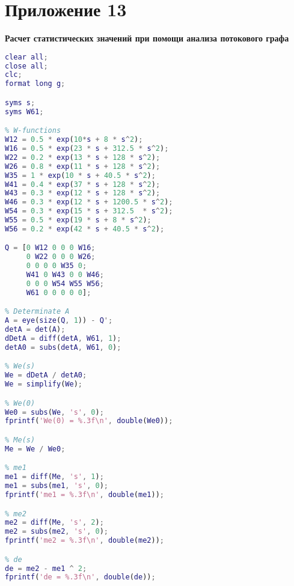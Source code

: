 \section*{Приложение 13} \label{p4:13}
\textbf{Расчет статистических значений при помощи анализа потокового графа}
\begin{lstlisting}[language={matlab}, caption={Расчет статистических значений при помощи анализа потокового графа}, label={lst:0}, basicstyle={\small\ttfamily}, breaklines={true}]
clear all;
close all; 
clc;
format long g;

syms s;
syms W61;

% W-functions
W12 = 0.5 * exp(10*s + 8 * s^2);
W16 = 0.5 * exp(23 * s + 312.5 * s^2);
W22 = 0.2 * exp(13 * s + 128 * s^2);
W26 = 0.8 * exp(11 * s + 128 * s^2);
W35 = 1 * exp(10 * s + 40.5 * s^2);
W41 = 0.4 * exp(37 * s + 128 * s^2);
W43 = 0.3 * exp(12 * s + 128 * s^2);
W46 = 0.3 * exp(12 * s + 1200.5 * s^2);
W54 = 0.3 * exp(15 * s + 312.5  * s^2);
W55 = 0.5 * exp(19 * s + 8 * s^2);
W56 = 0.2 * exp(42 * s + 40.5 * s^2);

Q = [0 W12 0 0 0 W16;
	 0 W22 0 0 0 W26;
  	 0 0 0 0 W35 0;
 	 W41 0 W43 0 0 W46;
 	 0 0 0 W54 W55 W56;
	 W61 0 0 0 0 0];

% Determinate A
A = eye(size(Q, 1)) - Q';
detA = det(A);
dDetA = diff(detA, W61, 1);
detA0 = subs(detA, W61, 0);

% We(s)
We = dDetA / detA0;
We = simplify(We);

% We(0)
We0 = subs(We, 's', 0);
fprintf('We(0) = %.3f\n', double(We0));

% Me(s)
Me = We / We0;

% me1
me1 = diff(Me, 's', 1);
me1 = subs(me1, 's', 0);
fprintf('me1 = %.3f\n', double(me1));

% me2
me2 = diff(Me, 's', 2);
me2 = subs(me2, 's', 0);
fprintf('me2 = %.3f\n', double(me2));

% de
de = me2 - me1 ^ 2;
fprintf('de = %.3f\n', double(de));
\end{lstlisting}



